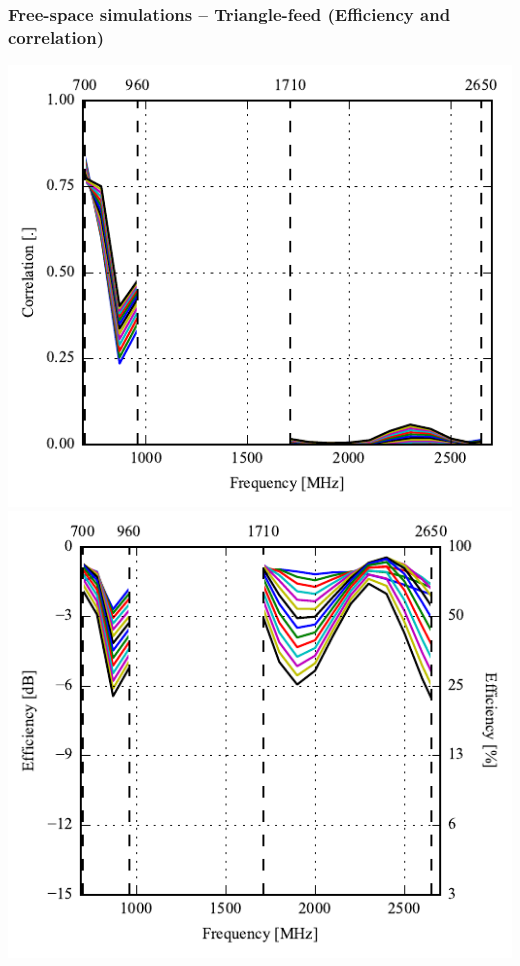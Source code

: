 \begin{frame}
    \frametitle{Free-space simulations -- Triangle-feed (Efficiency and correlation)}
    \vspace*{-0.5cm}
  \begin{minipage}[t]{0.49\linewidth}
    \vspace{0mm}

    \includegraphics[width=0.78\linewidth]{img/henrik/triag/correlation_Csh1-sweep} \\
    \includegraphics[width=0.78\linewidth]{img/henrik/triag/efficiency-ac1-csh1.pdf} \\



  \end{minipage}\hfill       
  \begin{minipage}[t]{0.49\linewidth}
    \vspace{0 mm}


\end{minipage}
\end{frame}
